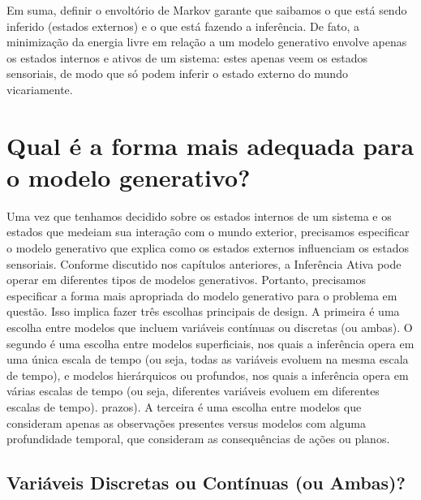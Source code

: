 \documentclass[
  12pt,
]{book}
\begin{document}
Em suma, definir o envoltório de Markov garante que saibamos o que está sendo inferido (estados externos) e o que está fazendo a inferência. De fato, a minimização da energia livre em relação a um modelo generativo envolve apenas os estados internos e ativos de um sistema: estes apenas veem os estados sensoriais, de modo que só podem inferir o estado externo do mundo vicariamente.

\hypertarget{qual-uxe9-a-forma-mais-adequada-para-o-modelo-generativo}{%
\section{Qual é a forma mais adequada para o modelo generativo?}\label{qual-uxe9-a-forma-mais-adequada-para-o-modelo-generativo}}

Uma vez que tenhamos decidido sobre os estados internos de um sistema e os estados que medeiam sua interação com o mundo exterior, precisamos especificar o modelo generativo que explica como os estados externos influenciam os estados sensoriais. Conforme discutido nos capítulos anteriores, a Inferência Ativa pode operar em diferentes tipos de modelos generativos. Portanto, precisamos especificar a forma mais apropriada do modelo generativo para o problema em questão. Isso implica fazer três escolhas principais de design. A primeira é uma escolha entre modelos que incluem variáveis \hspace{0pt}\hspace{0pt}contínuas ou discretas (ou ambas). O segundo é uma escolha entre modelos superficiais, nos quais a inferência opera em uma única escala de tempo (ou seja, todas as variáveis \hspace{0pt}\hspace{0pt}evoluem na mesma escala de tempo), e modelos hierárquicos ou profundos, nos quais a inferência opera em várias escalas de tempo (ou seja, diferentes variáveis \hspace{0pt}\hspace{0pt}evoluem em diferentes escalas de tempo). prazos). A terceira é uma escolha entre modelos que consideram apenas as observações presentes versus modelos com alguma profundidade temporal, que consideram as consequências de ações ou planos.

\hypertarget{variuxe1veis-discretas-ou-contuxednuas-ou-ambas}{%
\subsection{Variáveis Discretas ou Contínuas (ou Ambas)?}\label{variuxe1veis-discretas-ou-contuxednuas-ou-ambas}}
\end{document}
